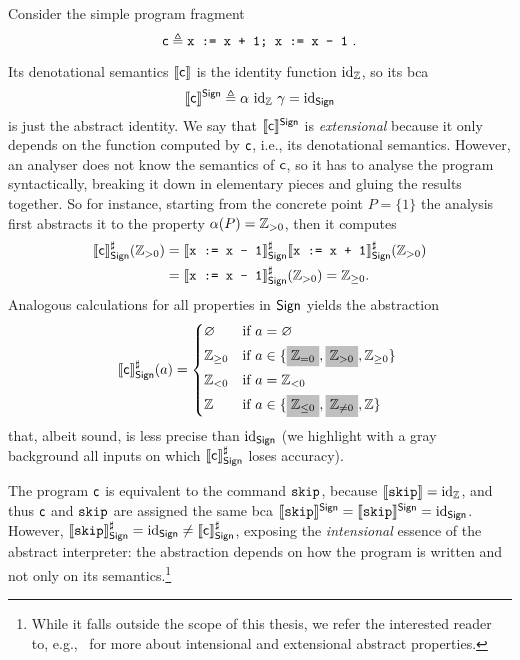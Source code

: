 \begin{example}
	Consider the simple program fragment
	$$\regc \eqdef \code{x := x + 1; x := x - 1}\ .$$

	Its denotational semantics $\llbracket\mathsf{c}\rrbracket$ is the identity function $\text{id}_{\mathbb{Z}}$, so its bca $$\llbracket\mathsf{c}\rrbracket^{\mathsf{Sign}} \triangleq \alpha~\text{id}_{\mathbb{Z}}~\gamma = \text{id}_{\mathsf{Sign}}$$
	is just the abstract identity. We say that $\llbracket\mathsf{c}\rrbracket^{\mathsf{Sign}}$ is \emph{extensional} because it only depends on the function computed by $\mathsf{c}$, i.e., its denotational semantics. However, an analyser does not know the semantics of $\mathsf{c}$, so it has to analyse the program syntactically, breaking it down in elementary pieces and gluing the results together. So for instance, starting from the concrete point $P = \{ 1 \}$ the analysis first abstracts it to the property $\alpha(P) = \mathbb{Z}_{> 0}$, then it computes
	\begin{align*}
		\llbracket\mathsf{c}\rrbracket^{\sharp}_{\mathsf{Sign}} (\mathbb{Z}_{> 0}) & = \llbracket\texttt{x := x - 1}\rrbracket^{\sharp}_{\mathsf{Sign}} \llbracket\texttt{x := x + 1}\rrbracket^{\sharp}_{\mathsf{Sign}} (\mathbb{Z}_{> 0}) \\
		                                             & = \llbracket\texttt{x := x - 1}\rrbracket^{\sharp}_{\mathsf{Sign}} (\mathbb{Z}_{> 0}) = \mathbb{Z}_{\ge 0} .
	\end{align*}
	Analogous calculations for all properties in $\mathsf{Sign}$ yields the abstraction
	\[
	\denot{\regc}^{\sharp}_{\Sign}(a) = \begin{cases*}
		\varnothing   & if $a = \varnothing$                                                                                     \\
		\setZ_{\ge 0} & if $a \in \{ \colorbox{lightgray}{$\setZ_{= 0}$}, \colorbox{lightgray}{$\setZ_{> 0}$}, \setZ_{\ge 0} \}$ \\
		\setZ_{< 0}   & if $a = \setZ_{< 0}$                                                                                     \\
		\setZ         & if $a \in \{ \colorbox{lightgray}{$\setZ_{\le 0}$}, \colorbox{lightgray}{$\setZ_{\neq 0}$}, \setZ \}$
	\end{cases*}
	\]
	that, albeit sound, is less precise than $\text{id}_{\mathsf{Sign}}$ (we highlight with a gray background all inputs on which $\llbracket\mathsf{c}\rrbracket^{\sharp}_{\mathsf{Sign}}$ loses accuracy).

	The program $\mathsf{c}$ is equivalent to the command $\texttt{skip}$, because $\llbracket\texttt{skip}\rrbracket=\text{id}_{\mathbb{Z}}$, and thus $\mathsf{c}$ and $\texttt{skip}$ are assigned the same bca $\llbracket\texttt{skip}\rrbracket^{\mathsf{Sign}} = \llbracket\texttt{skip}\rrbracket^{\mathsf{Sign}} =  \text{id}_{\mathsf{Sign}}$.
	However, $\llbracket\texttt{skip}\rrbracket^{\sharp}_{\mathsf{Sign}} = \text{id}_{\mathsf{Sign}} \neq \llbracket\mathsf{c}\rrbracket^{\sharp}_{\mathsf{Sign}}$, exposing the \emph{intensional} essence of the abstract interpreter: the abstraction depends on how the program is written and not only on its semantics.\footnote{While it falls outside the scope of this thesis, we refer the interested reader to, e.g.,~\cite{BGGGP19,BRZ22} for more about intensional and extensional abstract properties.}
\end{example}

